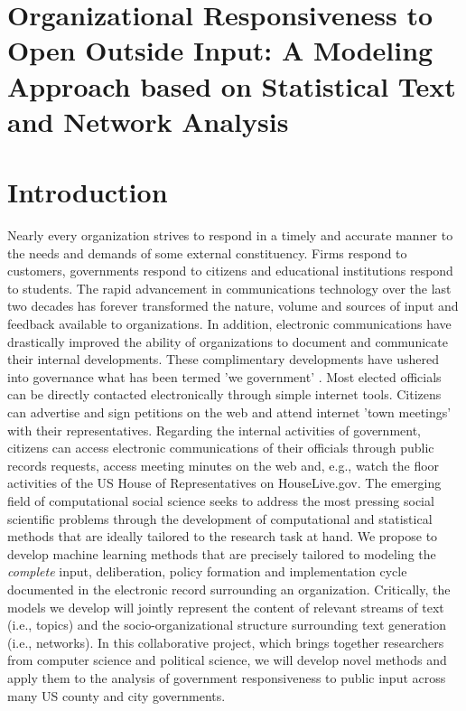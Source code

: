 

\section*{\Large Organizational Responsiveness to Open Outside Input:  A Modeling Approach based on Statistical Text and Network Analysis}



\section{Introduction}

Nearly every organization strives to respond in a timely and accurate manner to the needs and demands of some external constituency. Firms respond to customers, governments respond to citizens and educational institutions respond to students. The rapid advancement in communications technology over the last two decades has forever transformed the nature, volume and sources of input and feedback available to organizations. In addition, electronic communications have drastically improved the ability of organizations to document and communicate their internal developments. These complimentary developments have ushered into governance what has been termed 'we government' \cite{Linders2012}. Most elected officials can be directly contacted electronically through simple internet tools. Citizens can advertise and sign petitions on the web and attend internet 'town meetings' with their representatives. Regarding the internal activities of government, citizens can access electronic communications of their officials through public records requests, access meeting minutes on the web and, e.g., watch the floor activities of the US House of Representatives on HouseLive.gov. The emerging field of computational social science seeks to address the most pressing social scientific problems through the development of computational and statistical methods that are ideally tailored to the research task at hand. We propose to develop machine learning methods that are precisely tailored to modeling the {\em complete} input, deliberation, policy formation and implementation cycle documented in the electronic record surrounding an organization. Critically, the models we develop will jointly represent the content of relevant streams of text (i.e., topics) and the socio-organizational structure surrounding text generation (i.e., networks). In this collaborative project, which brings together researchers from computer science and political science, we will develop novel methods and apply them to the analysis of government responsiveness to public input across many US county and city governments.


